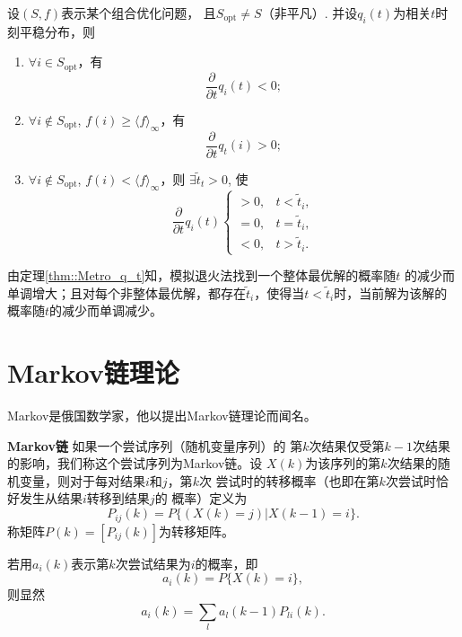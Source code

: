 \begin{theorem}{} 设$(S, f)$表示某个组合优化问题，
  且$S_{\mathrm{opt}} \neq S$（非平凡）. 并设$q_i(t)$为相关$t$时刻平稳分布，则
  \begin{enumerate}
  \item $\forall i \in S_{\mathrm{opt}}$，有
    \begin{equation}
      \frac{\partial}{\partial t}q_i(t) < 0;
    \end{equation}
  \item $\forall i \notin S_{\mathrm{opt}}$, $f(i) \geq \langle f\rangle_\infty$，有
    \begin{equation}
      \frac{\partial}{\partial t} q_t(i) > 0;
    \end{equation}
  \item $\forall i \notin S_{\mathrm{opt}}$, $f(i) < \langle f\rangle_\infty$，则
    $\exists \tilde{t}_t > 0$, 使
    \begin{equation}
      \frac{\partial}{\partial t} q_i(t) \left\{
      \begin{array}{ll}
        > 0, & t < \tilde{t}_i, \\
        = 0, & t = \tilde{t}_i, \\
        < 0, & t > \tilde{t}_i.
      \end{array}
      \right.
    \end{equation}
  \end{enumerate}
  \label{thm::Metro_q_t}
\end{theorem}

由定理\ref{thm::Metro_q_t}知，模拟退火法找到一个整体最优解的概率随$t$
的减少而单调增大；且对每个非整体最优解，都存在$\tilde{t}_i$，使得当$t
< \tilde{t}_i$时，当前解为该解的概率随$t$的减少而单调减少。

\section{Markov链理论}

Markov是俄国数学家，他以提出Markov链理论而闻名。

\begin{definition}{\hei \bf Markov链} 如果一个尝试序列（随机变量序列）的
  第$k$次结果仅受第$k - 1$次结果的影响，我们称这个尝试序列为Markov链。设
  $X(k)$为该序列的第$k$次结果的随机变量，则对于每对结果$i$和$j$，第$k$次
  尝试时的转移概率（也即在第$k$次尝试时恰好发生从结果$i$转移到结果$j$的
    概率）定义为
  \begin{equation}
    P_{ij}(k) = P\{(X(k) = j) | X(k - 1) = i\}.
  \end{equation}
  称矩阵$P(k) = [P_{ij}(k)]$为转移矩阵。
\end{definition}
若用$a_i(k)$表示第$k$次尝试结果为$i$的概率，即
\begin{equation}
  a_i(k) = P\{X(k) = i\},
\end{equation}
则显然
\begin{equation}
  a_i(k) = \sum_{l} a_l(k - 1)P_{li}(k).
\end{equation}

